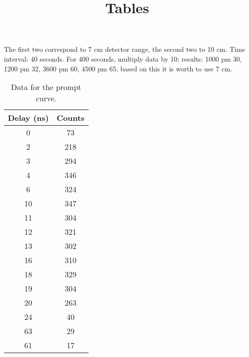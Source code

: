 \documentclass{article}
\title{Tables}
\begin{document}
The first two correspond to 7 cm detector range, the second two to 10 cm. Time interval: 40 seconds. For 400 seconds, multiply data by 10; results: 1000 pm 30, 1200 pm 32, 3600 pm 60, 4500 pm 65, based on this it is worth to use 7 cm. 
\begin{table}
\caption{Data for the prompt curve.}
\centering
\begin{tabular}{| c | c |}
\hline
Delay (ns)	&	Counts\\[0.5ex] \hline\hline
0			& 	73\\ 	\hline
2			& 	218\\	\hline
3			& 	294\\	\hline
4			& 	346\\	\hline
6			& 	324\\	\hline
10			& 	347\\	\hline
11			& 	304\\ 	\hline
12			& 	321\\	\hline
13			& 	302\\	\hline
16			& 	310\\	\hline
18			& 	329\\	\hline
19			& 	304\\	\hline
20			& 	263\\	\hline
24			& 	40\\	\hline
63			& 	29\\	\hline
61			& 	17\\	\hline
\end{tabular}
\end{table}
\end{document}
